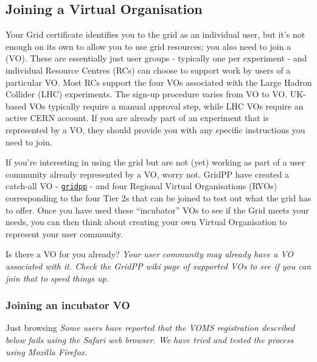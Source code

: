 \subsection{Joining a Virtual Organisation}
\label{sec:joinvo}
Your Grid certificate identifies you to the grid as an individual user,
but it's not enough on its own to allow you to use grid resources; you
also need to join a  (VO). These are essentially
just user groups - typically one per experiment - and individual
Resource Centres (RCs) can choose to support work by users of a
particular VO. Most RCs support the four VOs associated with the Large
Hadron Collider (LHC) experiments. The sign-up procedure varies from VO
to VO. UK-based VOs typically require a manual approval step, while LHC
VOs require an active CERN account. If you are already part of an
experiment that is represented by a VO, they should provide you with any
specific instructions you need to join.

If you're interesting in using the grid but are not (yet) working as
part of a user community already represented by a VO, worry not. GridPP
have created a catch-all VO -
\href{https://voms.gridpp.ac.uk:8443/voms/gridpp/}{\texttt{gridpp}} -
and four Regional Virtual Organisations (RVOs) corresponding to the four
Tier 2s that can be joined to test out what the grid has to offer. Once
you have used these ``incubator'' VOs to see if the Grid meets your
needs, you can then think about creating your own Virtual Organisation
to represent your user community.

\begin{infobox}{Is there a VO for you already?}
\emph{Your user community may already have a VO associated with it. Check the
GridPP wiki page of supported VOs to see if you can join that to speed
things up.}
\end{infobox}

\subsubsection{Joining an incubator VO}
\label{joining-an-incubator-vo}
\begin{infobox}{Just browsing}
\emph{Some users have reported that the VOMS registration described below
fails using the Safari web browser. We have tried and tested the process
using Mozilla Firefox.}
\end{infobox}

